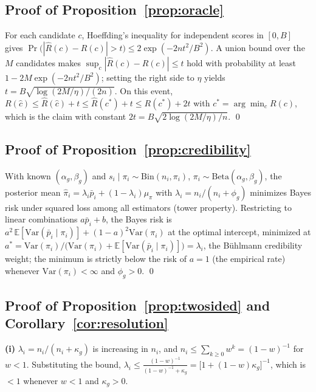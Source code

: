 \documentclass[twocolumn,10pt]{article}
\newcommand{\E}{\mathbb{E}}
\newcommand{\Var}{\mathrm{Var}}
\begin{document}
\subsection{Proof of Proposition~\ref{prop:oracle}}
For each candidate $c$, Hoeffding's inequality for independent scores in
$[0,B]$ gives
$\Pr\bigl(|\hat R(c)-R(c)|>t\bigr)\le2\exp(-2nt^2/B^2)$. A union bound
over the $M$ candidates makes
$\sup_c|\hat R(c)-R(c)|\le t$ hold with probability at least
$1-2M\exp(-2nt^2/B^2)$; setting the right side to $\eta$ yields
$t=B\sqrt{\log(2M/\eta)/(2n)}$. On this event,
$R(\hat c)\le\hat R(\hat c)+t\le\hat R(c^{*})+t\le R(c^{*})+2t$ with
$c^{*}=\arg\min_c R(c)$, which is the claim with constant
$2t=B\sqrt{2\log(2M/\eta)/n}$. \qed

\subsection{Proof of Proposition~\ref{prop:credibility}}
With known $(\alpha_g,\beta_g)$ and $s_i\mid\pi_i\sim
\mathrm{Bin}(n_i,\pi_i)$, $\pi_i\sim\mathrm{Beta}(\alpha_g,\beta_g)$,
the posterior mean $\hat\pi_i=\lambda_i\bar p_i+(1-\lambda_i)\mu_\pi$
with $\lambda_i=n_i/(n_i+\phi_g)$ minimizes Bayes risk under squared
loss among all estimators (tower property). Restricting to linear
combinations $a\bar p_i+b$, the Bayes risk is
$a^2\,\E[\Var(\bar p_i\mid\pi_i)] + (1-a)^2\Var(\pi_i)$ at the optimal
intercept, minimized at
$a^{*}=\Var(\pi_i)/\bigl(\Var(\pi_i)+\E[\Var(\bar p_i\mid\pi_i)]\bigr)
=\lambda_i$, the B\"uhlmann credibility weight; the minimum is strictly
below the risk of $a=1$ (the empirical rate) whenever
$\Var(\pi_i)<\infty$ and $\phi_g>0$. \qed

\subsection{Proof of Proposition~\ref{prop:twosided} and
Corollary~\ref{cor:resolution}}

\textbf{(i)} $\lambda_i=n_i/(n_i+\kappa_g)$ is increasing in $n_i$, and
$n_i\le\sum_{k\ge0}w^{k}=(1-w)^{-1}$ for $w<1$. Substituting the bound,
$\lambda_i\le\frac{(1-w)^{-1}}{(1-w)^{-1}+\kappa_g}
=\bigl[1+(1-w)\kappa_g\bigr]^{-1}$, which is $<1$ whenever $w<1$ and
$\kappa_g>0$.
\end{document}
